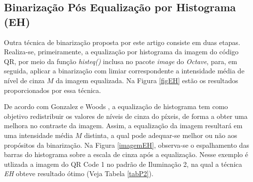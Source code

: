 \documentclass{ceel}
\begin{document}
\begin{multicols}{2}
\begin{minipage}[h]{\columnwidth}
\vspace{-0.1cm}
\caption{Imagens resultantes da Binarização com Limiar Fixo para o QR Code 3 nos padrões de (a) Iluminação 1, (c) Iluminação 2 e (e) Iluminação 3, com suas respectivas imagens diferença em (b), (d) e (f).} \label{figLF}
\end{minipage}

\subsection{Binarização Pós Equalização por Histograma (EH)} \label{Bhist}
Outra técnica de binarização proposta por este artigo consiste em duas etapas. Realiza-se, primeiramente, a equalização por histograma da imagem do código QR, por meio da função \emph{histeq()} inclusa no pacote \emph{image} do \emph{Octave}, para, em seguida, aplicar a binarização com limiar correspondente a intensidade média de nível de cinza  $M$ da imagem equalizada. Na Figura \ref{figEH} estão os resultados proporcionados por essa técnica.

De acordo com Gonzalez e Woods \cite{gonzales}, a equalização de histograma tem como objetivo redistribuir os valores de níveis de cinza do píxeis, de forma a obter uma melhora no contraste da imagem. Assim, a equalização da imagem resultará em uma intensidade média $M$ distinta, a qual pode adequar-se melhor ou não aos propósitos da binarização. Na Figura \ref{imagemEH}, observa-se o espalhamento das barras do histograma sobre a escala de cinza após a equalização. Nesse exemplo é utlizada a imagem do QR Code 1 no padrão de Iluminação 2, na qual a técnica \emph{EH} obteve resultado ótimo (Veja Tabela \ref{tabP2}).



\end{multicols}
\end{document}
